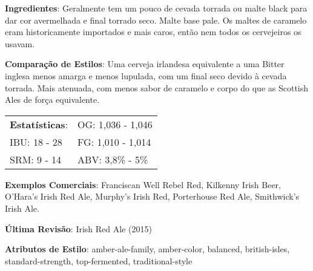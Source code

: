 \textbf{Ingredientes}: Geralmente tem um pouco de cevada torrada ou malte black para dar cor avermelhada e final torrado seco. Malte base pale. Os maltes de caramelo eram historicamente importados e mais caros, então nem todos os cervejeiros os usavam.

\textbf{Comparação de Estilos}: Uma cerveja irlandesa equivalente a uma Bitter inglesa menos amarga e menos lupulada, com um final seco devido à cevada torrada. Mais atenuada, com menos sabor de caramelo e corpo do que as Scottish Ales de força equivalente.

\begin{tabular}{@{}p{35mm}p{35mm}@{}}
  \textbf{Estatísticas}: & OG: 1,036 - 1,046 \\
  IBU: 18 - 28  & FG: 1,010 - 1,014 \\
  SRM: 9 - 14  & ABV: 3,8\% - 5\%
\end{tabular}

\textbf{Exemplos Comerciais}: Franciscan Well Rebel Red, Kilkenny Irish Beer, O'Hara's Irish Red Ale, Murphy's Irish Red, Porterhouse Red Ale, Smithwick's Irish Ale.

\textbf{Última Revisão}: Irish Red Ale (2015)

\textbf{Atributos de Estilo}: amber-ale-family, amber-color, balanced, british-isles, standard-strength, top-fermented, traditional-style
